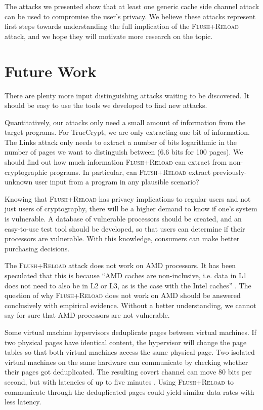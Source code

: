 \documentclass[letterpaper,twocolumn,10pt]{article}
\begin{document}
The attacks we presented show that at least one generic cache side channel
attack can be used to compromise the user's privacy. We believe these attacks
represent first steps towards understanding the full implication of the
\textsc{Flush+Reload} attack, and we hope they will motivate more research on
the topic.

\section{Future Work}
\label{sec:future}

There are plenty more input distinguishing attacks waiting to be discovered. It
should be easy to use the tools we developed to find new attacks.

Quantitatively, our attacks only need a small amount of information from the
target programs. For TrueCrypt, we are only extracting one bit of information.
The Links attack only needs to extract a number of bits logarithmic in the
number of pages we want to distinguish between (6.6 bits for 100 pages). We
should find out how much information \textsc{Flush+Reload} can extract from
non-cryptographic programs. In particular, can \textsc{Flush+Reload} extract
previously-unknown user input from a program in any plausible scenario?

Knowing that \textsc{Flush+Reload} has privacy implications to regular users and
not just users of cryptography, there will be a higher demand to know if one's
system is vulnerable. A database of vulnerable processors should be created, and
an easy-to-use test tool should be developed, so that users can determine if
their processors are vulnerable. With this knowledge, consumers can make better
purchasing decisions.

The \textsc{Flush+Reload} attack does not work on AMD processors. It has been
speculated that this is because ``AMD caches are non-inclusive, i.e. data in L1
does not need to also be in L2 or L3, as is the case with the Intel caches''
\cite{yarom2013flush}. The question of why \textsc{Flush+Reload} does not work
on AMD should be answered conclusively with empirical evidence. Without a better
understanding, we cannot say for sure that AMD processors are not vulnerable. 

Some virtual machine hypervisors deduplicate pages between virtual machines. If
two physical pages have identical content, the hypervisor will change the page
tables so that both virtual machines access the same physical page. Two isolated
virtual machines on the same hardware can communicate by checking whether their
pages got deduplicated. The resulting covert channel can move 80 bits per
second, but with latencies of up to five minutes \cite{xiao2013security}. Using
\textsc{Flush+Reload} to communicate through the deduplicated pages could yield
similar data rates with less latency.
\end{document}
